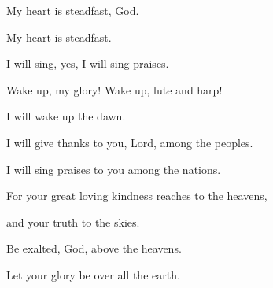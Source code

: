 {\Q {}My heart is steadfast, God.
\par }{\QB My heart is steadfast.
\par }{\QB I will sing, yes, I will sing praises.
\par }{\Q {}Wake up, my glory! Wake up, lute and harp!
\par }{\QB I will wake up the dawn.
\par }{\Q {}I will give thanks to you, Lord, among the peoples.
\par }{\QB I will sing praises to you among the nations.
\par }{\Q {}For your great loving kindness reaches to the heavens,
\par }{\QB and your truth to the skies.
\par }{\Q {}Be exalted, God, above the heavens.
\par }{\QB Let your glory be over all the earth.

}
